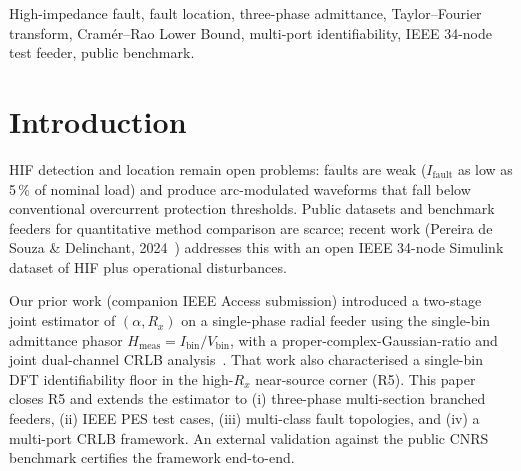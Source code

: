 \documentclass[conference]{IEEEtran}
\begin{document}
\begin{IEEEkeywords}
High-impedance fault, fault location, three-phase admittance,
Taylor--Fourier transform, Cram\'er--Rao Lower Bound, multi-port
identifiability, IEEE 34-node test feeder, public benchmark.
\end{IEEEkeywords}

\section{Introduction}\label{sec:intro}
HIF detection and location remain open problems: faults are weak
($I_\mathrm{fault}$ as low as 5\,\% of nominal load) and produce
arc-modulated waveforms that fall below conventional overcurrent
protection thresholds.  Public datasets and benchmark feeders for
quantitative method comparison are scarce; recent work
(Pereira de Souza \& Delinchant, 2024~\cite{PereiraDeSouza2024CNRS})
addresses this with an open IEEE 34-node Simulink dataset of HIF
plus operational disturbances.

Our prior work (companion IEEE Access submission) introduced a
two-stage joint estimator of $(\alpha, R_x)$ on a single-phase
radial feeder using the single-bin admittance phasor
$H_\mathrm{meas} = I_\mathrm{bin} / V_\mathrm{bin}$, with a
proper-complex-Gaussian-ratio and joint dual-channel CRLB
analysis~\cite{Kuruoglu2018ASCE,NehoraiHawkes2000}.  That work also
characterised a single-bin DFT identifiability floor in the high-$R_x$
near-source corner (R5).  This paper closes R5 and extends the
estimator to (i) three-phase multi-section branched feeders, (ii)
IEEE PES test cases, (iii) multi-class fault topologies, and (iv) a
multi-port CRLB framework.  An external validation against the
public CNRS benchmark certifies the framework end-to-end.
\end{document}
